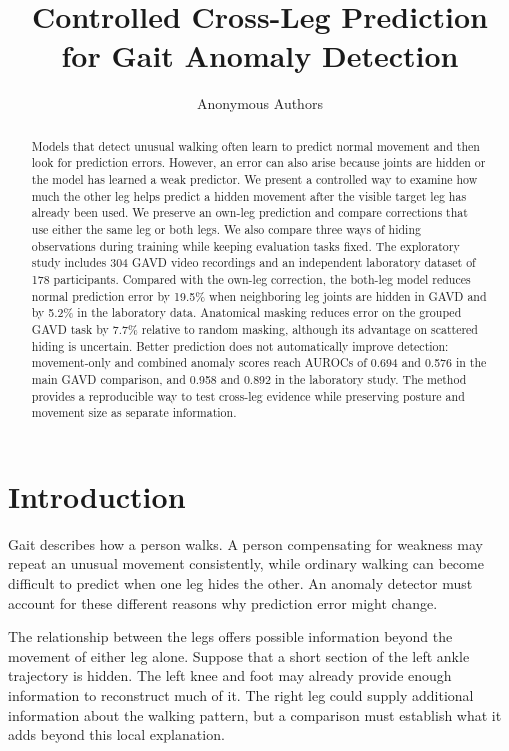 \documentclass[letterpaper]{article}
\title{Controlled Cross-Leg Prediction for Gait Anomaly Detection}
\author{Anonymous Authors}
\begin{document}
\maketitle
\begin{abstract}
Models that detect unusual walking often learn to predict normal movement and then look for prediction errors. However, an error can also arise because joints are hidden or the model has learned a weak predictor. We present a controlled way to examine how much the other leg helps predict a hidden movement after the visible target leg has already been used. We preserve an own-leg prediction and compare corrections that use either the same leg or both legs. We also compare three ways of hiding observations during training while keeping evaluation tasks fixed. The exploratory study includes 304 GAVD video recordings and an independent laboratory dataset of 178 participants. Compared with the own-leg correction, the both-leg model reduces normal prediction error by 19.5\% when neighboring leg joints are hidden in GAVD and by 5.2\% in the laboratory data. Anatomical masking reduces error on the grouped GAVD task by 7.7\% relative to random masking, although its advantage on scattered hiding is uncertain. Better prediction does not automatically improve detection: movement-only and combined anomaly scores reach AUROCs of 0.694 and 0.576 in the main GAVD comparison, and 0.958 and 0.892 in the laboratory study. The method provides a reproducible way to test cross-leg evidence while preserving posture and movement size as separate information.
\end{abstract}
\section{Introduction}

Gait describes how a person walks. A person compensating for weakness may repeat an unusual movement consistently, while ordinary walking can become difficult to predict when one leg hides the other. An anomaly detector must account for these different reasons why prediction error might change.

The relationship between the legs offers possible information beyond the movement of either leg alone. Suppose that a short section of the left ankle trajectory is hidden. The left knee and foot may already provide enough information to reconstruct much of it. The right leg could supply additional information about the walking pattern, but a comparison must establish what it adds beyond this local explanation.
\end{document}
